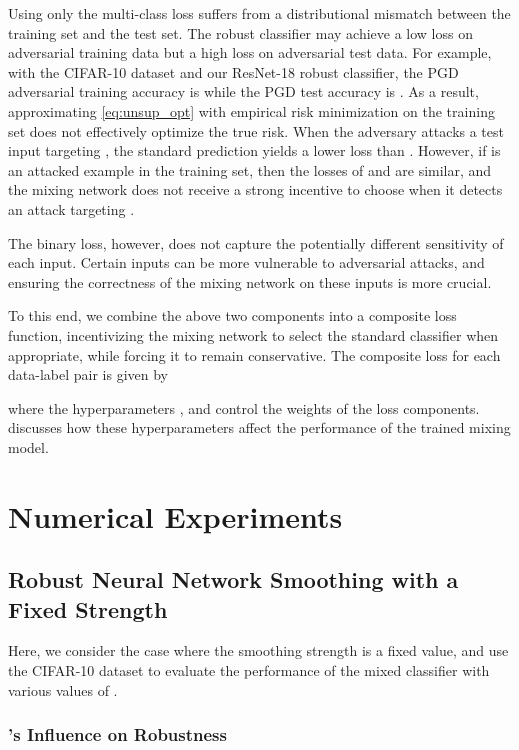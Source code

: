 \documentclass[11pt, letterpaper]{article}
\theoremstyle{plain}
\theoremstyle{definition}
\begin{document}
Using only the multi-class loss suffers from a distributional mismatch between the training set and the test set. The robust classifier  may achieve a low loss on adversarial training data but a high loss on adversarial test data. For example, with the CIFAR-10 dataset and our ResNet-18 robust classifier, the PGD adversarial training accuracy is  while the PGD test accuracy is . As a result, approximating \cref{eq:unsup_opt} with empirical risk minimization on the training set does not effectively optimize the true risk. When the adversary attacks a test input  targeting , the standard prediction  yields a lower loss than . However, if  is an attacked example in the training set, then the losses of  and  are similar, and the mixing network does not receive a strong incentive to choose  when it detects an attack targeting .

The binary loss, however, does not capture the potentially different sensitivity of each input. Certain inputs can be more vulnerable to adversarial attacks, and ensuring the correctness of the mixing network on these inputs is more crucial.

To this end, we combine the above two components into a composite loss function, incentivizing the mixing network to select the standard classifier  when appropriate, while forcing it to remain conservative. The composite loss for each data-label pair  is given by

where the hyperparameters , and  control the weights of the loss components.  discusses how these hyperparameters affect the performance of the trained mixing model.



\section{Numerical Experiments} \label{sec:experiments}

\subsection{Robust Neural Network Smoothing with a Fixed Strength} \label{sec:exp_CNN_fix}

Here, we consider the case where the smoothing strength  is a fixed value, and use the CIFAR-10 dataset to evaluate the performance of the mixed classifier  with various values of .

\subsubsection{'s Influence on Robustness} \label{sec:alpha_analysis}
\end{document}

